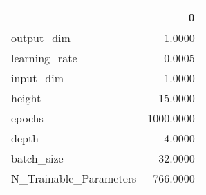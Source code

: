 \begin{tabular}{lr}
\toprule
{} &          0 \\
\midrule
output\_dim             &     1.0000 \\
learning\_rate          &     0.0005 \\
input\_dim              &     1.0000 \\
height                 &    15.0000 \\
epochs                 &  1000.0000 \\
depth                  &     4.0000 \\
batch\_size             &    32.0000 \\
N\_Trainable\_Parameters &   766.0000 \\
\bottomrule
\end{tabular}
